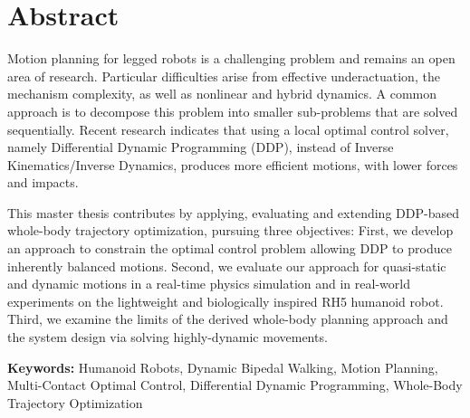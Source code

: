 \thispagestyle{empty}
\chapter*{Abstract}

Motion planning for legged robots is a challenging problem and remains an open area of research. Particular difficulties arise from effective underactuation, the mechanism complexity, as well as nonlinear and hybrid dynamics.
A common approach is to decompose this problem into smaller sub-problems that are solved sequentially. Recent research indicates that using a local optimal control solver, namely Differential Dynamic Programming (DDP), instead of Inverse Kinematics/Inverse Dynamics, produces more efficient motions, with lower forces and impacts. 

This master thesis contributes by applying, evaluating and extending DDP-based whole-body trajectory optimization, pursuing three objectives: 
First, we develop an approach to constrain the optimal control problem allowing DDP to produce inherently balanced motions. 
Second, we evaluate our approach for quasi-static and dynamic motions in a real-time physics simulation and in real-world experiments on the lightweight and biologically inspired RH5 humanoid robot.
Third, we examine the limits of the derived whole-body planning approach and the system design via solving highly-dynamic movements. 

\vfill
\textbf{Keywords:} Humanoid Robots, Dynamic Bipedal Walking, Motion Planning, Multi-Contact Optimal Control, Differential Dynamic Programming, Whole-Body Trajectory Optimization  
 











